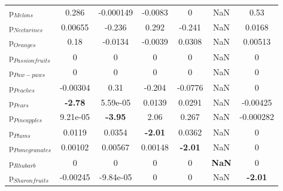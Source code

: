 \documentclass[11pt]{article}
\begin{document}
\begin{table}[h]
\begin{center}
\begin{tabular}{lcccccc}
p$_{Melons}$ &0.286 &-0.000149 &-0.0083 &0 &NaN &0.53 \\
p$_{Nectarines}$ &0.00655 &-0.236 &0.292 &-0.241 &NaN &0.0168 \\
p$_{Oranges}$ &0.18 &-0.0134 &-0.0039 &0.0308 &NaN &0.00513 \\
p$_{Passion fruits}$ &0 &0 &0 &0 &NaN &0 \\
p$_{Paw-paws}$ &0 &0 &0 &0 &NaN &0 \\
p$_{Peaches}$ &-0.00304 &0.31 &-0.204 &-0.0776 &NaN &0 \\
p$_{Pears}$ &\textbf{-2.78} &5.59e-05 &0.0139 &0.0291 &NaN &-0.00425 \\
p$_{Pineapples}$ &9.21e-05 &\textbf{-3.95} &2.06 &0.267 &NaN &-0.000282 \\
p$_{Plums}$ &0.0119 &0.0354 &\textbf{-2.01} &0.0362 &NaN &0 \\
p$_{Pomegranates}$ &0.00102 &0.00567 &0.00148 &\textbf{-2.01} &NaN &0 \\
p$_{Rhubarb}$ &0 &0 &0 &0 &\textbf{NaN} &0 \\
p$_{Sharon fruits}$ &-0.00245 &-9.84e-05 &0 &0 &NaN &\textbf{-2.01} \\
\end{tabular}
\end{center}
\end{table}
\end{document}
